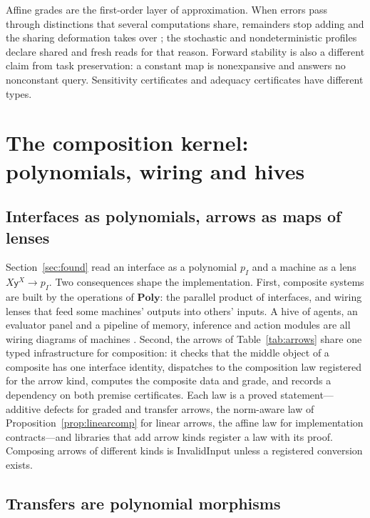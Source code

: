 \documentclass[11pt]{article}
\newcommand{\Poly}{\mathbf{Poly}}
\theoremstyle{definition}
\theoremstyle{plain}
\begin{document}
Affine grades are the first-order layer of approximation. When errors pass through distinctions
that several computations share, remainders stop adding and the sharing deformation takes over
\cite{aat}; the stochastic and nondeterministic profiles declare shared and fresh reads for that
reason. Forward stability is also a different claim from task preservation: a constant map is
nonexpansive and answers no nonconstant query. Sensitivity certificates and adequacy certificates
have different types.

\section{The composition kernel: polynomials, wiring and hives}\label{sec:compose}

\subsection{Interfaces as polynomials, arrows as maps of lenses}

Section~\ref{sec:found} read an interface as a polynomial $p_I$ and a machine as a lens
$X\mathsf y^X\to p_I$. Two consequences shape the implementation. First, composite systems are
built by the operations of $\Poly$: the parallel product of interfaces, and wiring lenses that feed
some machines' outputs into others' inputs. A hive of agents, an evaluator panel and a pipeline of
memory, inference and action modules are all wiring diagrams of machines \cite{niuspivak}. Second,
the arrows of Table~\ref{tab:arrows} share one typed infrastructure for composition: it checks that
the middle object of a composite has one interface identity, dispatches to the composition law
registered for the arrow kind, computes the composite data and grade, and records a dependency on
both premise certificates. Each law is a proved statement---additive defects for graded and
transfer arrows, the norm-aware law of Proposition~\ref{prop:linearcomp} for linear arrows, the
affine law for implementation contracts---and libraries that add arrow kinds register a law with
its proof. Composing arrows of different kinds is InvalidInput unless a registered conversion
exists.

\subsection{Transfers are polynomial morphisms}\label{sec:transferpoly}
\end{document}

